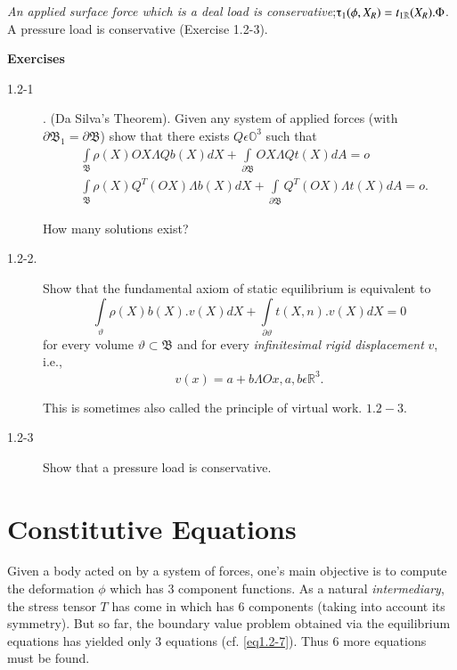 \textit{An applied surface force which is a deal load is
  conservative};\hfill\break $\tauup_1 (\phi,X_R) = t_{1\mathbb{R}}(X_R).\Phi$. A
pressure load is conservative (Exercise 1.2-3). 

\medskip
\begin{center}
{\large\bf Exercises}
\end{center}

\begin{description}
\item[1.2-1]. (Da Silva's Theorem). Given
  any system of applied 
  forces (with $\partial\mathfrak{B}_1 = \partial\mathfrak{B}$) show
  that there exists $Q \epsilon \mathbb{O}^3$ such that  
  \begin{align*}
    & \int\limits_{\mathfrak{B}} \rho(X) OX \Lambda Q b(X)dX +
    \int\limits_{\partial \mathfrak{B}} OX \Lambda Q t(X) dA = o\\ 
    & \int\limits_{\mathfrak{B}}  \rho(X) Q^T(OX) \Lambda b(X)dX +
    \int\limits_{\partial \mathfrak{B}} Q^T(OX) \Lambda t(X)dA = o. 
  \end{align*}

How many solutions exist?

\item[1.2-2.] Show that the fundamental axiom of static equilibrium
  is equivalent to  
  $$
  \int\limits_{\vartheta}\rho(X) b(X).v(X)dX +
  \int\limits_{\partial\vartheta} t(X,n).v(X) dX = 0 
  $$\pageoriginale
for every volume $\vartheta \subset \mathfrak{B}$ and for every
\textit{infinitesimal rigid displacement}  $v$, i.e., 
  $$
   v(x) = a + b \Lambda O x,a,b \epsilon \mathbb{R}^3.
  $$

This is sometimes also called the principle of virtual work. $1.2-3$. 

\item[1.2-3]Show that a pressure load is conservative.
\end{description}

\section{Constitutive Equations}\label{chap1-sec1.3}%
\setcounter{figure}{0}

Given a body acted on by a system of forces, one's main objective is
to compute the deformation $\phi$ which has $3$ component
functions. As a natural \textit{intermediary}, the stress tensor $T$
has come in which has 6 components (taking into account its
symmetry). But so far, the boundary value problem obtained via the
equilibrium equations has yielded only $3$ equations
(cf. \eqref{eq1.2-7}). Thus 6 more equations must be found. 

